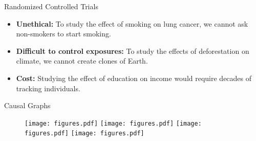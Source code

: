 \documentclass[aspectratio=169]{beamer}
\begin{document}
\begin{frame}{Randomized Controlled Trials}
	
	\vspace{2em}

	\begin{itemize}[<+->]
		\item \textbf{Unethical: } To study the effect of smoking on lung cancer, we cannot ask non-smokers to start smoking.
		\item \textbf{Difficult to control exposures:} To study the effects of deforestation on climate, we cannot create clones of Earth.
		\item \textbf{Cost:} Studying the effect of education on income would require decades of tracking individuals.
	\end{itemize}

	\vspace{2em}

\end{frame}

\begin{frame}{Causal Graphs}
	\vspace{0.5em}
	\begin{figure}
		\begin{overprint}
			 \center \texttt{[image: figures.pdf]}
			\onslide<2> \center \texttt{[image: figures.pdf]}
			\onslide<3> \center \texttt{[image: figures.pdf]}
			\onslide<4> \center \texttt{[image: figures.pdf]}
		\end{overprint}
	\end{figure}

\end{frame}

% 
% 
% 
\end{document}
